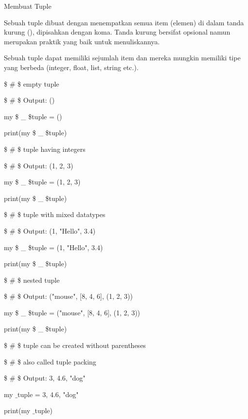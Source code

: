 \vspace{12pt}
Membuat Tuple \par
\vspace{12pt}
Sebuah tuple dibuat dengan menempatkan semua item (elemen) di dalam tanda kurung (), dipisahkan dengan koma. Tanda kurung bersifat opsional namun merupakan praktik yang baik untuk menuliskannya. \par
\vspace{12pt}
Sebuah tuple dapat memiliki sejumlah item dan mereka mungkin memiliki tipe yang berbeda (integer, float, list, string etc.). \par
\vspace{12pt}
\vspace{12pt}
 \$  \#  \$ empty tuple \par
 \$  \#  \$ Output: () \par
my \$  \_  \$tuple = () \par
print(my \$  \_  \$tuple) \par
\vspace{12pt}
 \$  \#  \$ tuple having integers \par
 \$  \#  \$ Output: (1, 2, 3) \par
my \$  \_  \$tuple = (1, 2, 3) \par
print(my \$  \_  \$tuple) \par
\vspace{12pt}
 \$  \#  \$ tuple with mixed datatypes \par
 \$  \#  \$ Output: (1, "Hello", 3.4) \par
my \$  \_  \$tuple = (1, "Hello", 3.4) \par
print(my \$  \_  \$tuple) \par
\vspace{12pt}
 \$  \#  \$ nested tuple \par
 \$  \#  \$ Output: ("mouse", [8, 4, 6], (1, 2, 3)) \par
my \$  \_  \$tuple = ("mouse", [8, 4, 6], (1, 2, 3)) \par
print(my \$  \_  \$tuple) \par
\vspace{12pt}
 \$  \#  \$ tuple can be created without parentheses \par
 \$  \#  \$ also called tuple packing \par
 \$  \#  \$ Output: 3, 4.6, "dog" \par
\vspace{12pt}
my $  \_  $tuple = 3, 4.6, "dog" \par
print(my $  \_  $tuple) \par
